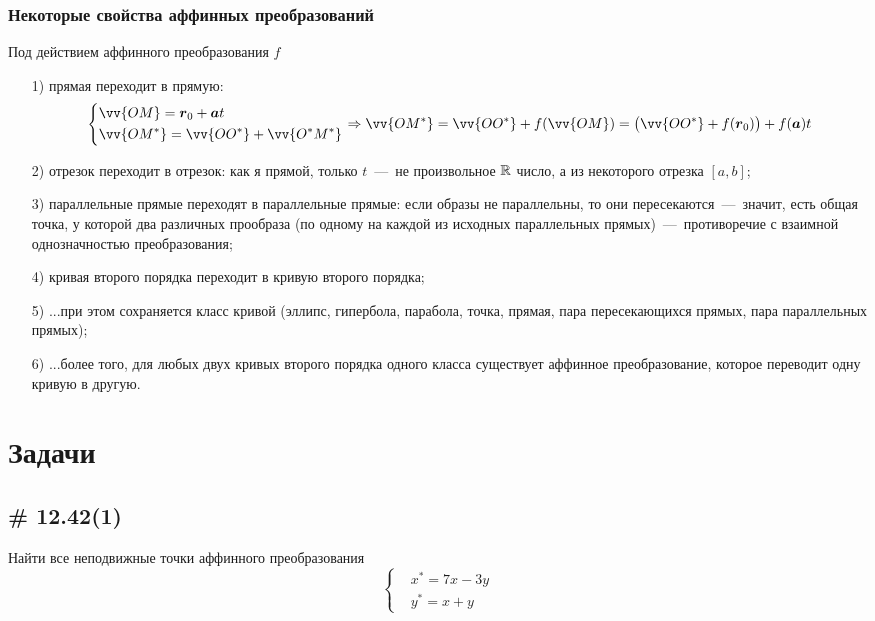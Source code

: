 \documentclass[a4paper,12pt]{article}
\begin{document}
  
  \subsubsection{Некоторые свойства аффинных преобразований}
  
  Под действием аффинного преобразования $f$
  \begin{enumerate}
    \item[1)] прямая переходит в прямую:
    \[
        \left\{
          \begin{aligned}
            &\vv{OM} = \bds r_0 + \bds a t\\
            &\vv{OM^*} = \vv{OO^*} + \vv{O^*M^*}
          \end{aligned}
        \right.
        \Rightarrow
        \vv{OM^*} = \vv{OO^*} + f(\vv{OM}) = \bigl(\vv{OO^*} + f(\bds r_0)\bigr) + f(\bds a) t
    \]
    \item[2)] отрезок переходит в отрезок: как я прямой, только $t$~---~не произвольное $\operatorname{\mathbb R}$ число, а из некоторого отрезка $[a, b]$;
    \item[3)] параллельные прямые переходят в параллельные прямые: если образы не параллельны, то они пересекаются~---~значит, есть общая точка, у которой два различных прообраза (по одному на каждой из исходных параллельных прямых)~---~противоречие с взаимной однозначностью преобразования;
    \item[4)] кривая второго порядка переходит в кривую второго порядка;
    \item[5)] ...при этом сохраняется класс кривой (эллипс, гипербола, парабола, точка, прямая, пара пересекающихся прямых, пара параллельных прямых);
    \item[6)] ...более того, для любых двух кривых второго порядка одного класса существует аффинное преобразование, которое переводит одну кривую в другую.
  \end{enumerate}
  
  
  \section{Задачи}
  
  \subsection{\# 12.42(1)}
  
  Найти все неподвижные точки аффинного преобразования
  \[
    \left\{
      \begin{aligned}
        &x^* = 7x - 3y\\
        &y^* = x + y
      \end{aligned}
    \right.
  \]
  
\end{document}
